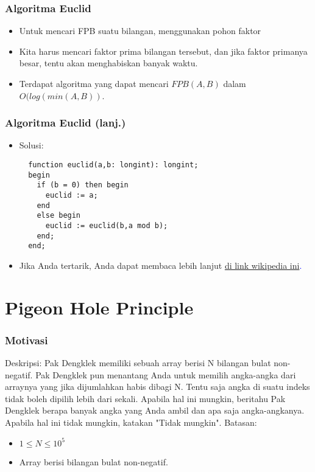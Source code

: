 \begin{frame}
\frametitle{Algoritma Euclid}
\begin{itemize}
  \item Untuk mencari FPB suatu bilangan, menggunakan pohon faktor 
  \item Kita harus mencari faktor prima bilangan tersebut, dan jika faktor primanya besar, tentu akan menghabiskan banyak waktu.
  \item Terdapat algoritma yang dapat mencari $FPB(A,B)$ dalam $O(log(min(A,B))$.
\end{itemize}
\end{frame}

\begin{frame}[fragile]
\frametitle{Algoritma Euclid (lanj.)}
\begin{itemize}
  \item Solusi:
  \begin{lstlisting}
  function euclid(a,b: longint): longint;
  begin
    if (b = 0) then begin
      euclid := a;
    end
    else begin
      euclid := euclid(b,a mod b);
    end;
  end;
  \end{lstlisting}
  \item Jika Anda tertarik, Anda dapat membaca lebih lanjut \textcolor{blue}{\href{https://en.wikipedia.org/wiki/Euclidean_algorithm}{di link wikipedia ini}.}   
\end{itemize}
\end{frame}

\section{Pigeon Hole Principle}
\frame{\sectionpage}

\begin{frame}
\frametitle{Motivasi}
Deskripsi: \newline
Pak Dengklek memiliki sebuah array berisi N bilangan bulat non-negatif. Pak Dengklek pun menantang Anda untuk memilih angka-angka dari arraynya yang jika dijumlahkan habis dibagi N. Tentu saja angka di suatu indeks tidak boleh dipilih lebih dari sekali. Apabila hal ini mungkin, beritahu Pak Dengklek berapa banyak angka yang Anda ambil dan apa saja angka-angkanya. Apabila hal ini tidak mungkin, katakan "Tidak mungkin". \newline\newline
Batasan:
\begin{itemize}
  \item $1 \leq N \leq 10^{5}$
  \item Array berisi bilangan bulat non-negatif.
\end{itemize}
\end{frame}

